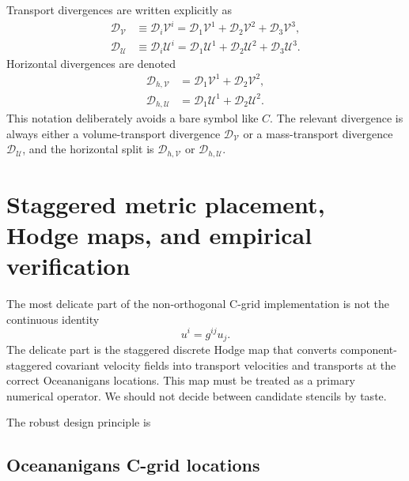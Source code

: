 \documentclass[11pt]{article}
\newcommand{\mc}[1]{\mathcal{#1}}
\newcommand{\Div}{\mc{D}}
\newcommand{\Vflux}{\mc{V}}
\newcommand{\Uflux}{\mc{U}}
\newcommand{\Dvol}{\Div_{\Vflux}}
\newcommand{\Dmass}{\Div_{\Uflux}}
\newcommand{\Dhvol}{\Div_{h,\Vflux}}
\newcommand{\Dhmass}{\Div_{h,\Uflux}}
\begin{document}
Transport divergences are written explicitly as
\begin{align}
  \Dvol
  &\equiv \Div_i \Vflux^i
   = \Div_1\Vflux^1 + \Div_2\Vflux^2 + \Div_3\Vflux^3,
  \label{eq:volume-divergence} \\
  \Dmass
  &\equiv \Div_i \Uflux^i
   = \Div_1\Uflux^1 + \Div_2\Uflux^2 + \Div_3\Uflux^3.
  \label{eq:mass-divergence}
\end{align}
Horizontal divergences are denoted
\begin{align}
  \Dhvol &= \Div_1\Vflux^1 + \Div_2\Vflux^2, \\
  \Dhmass &= \Div_1\Uflux^1 + \Div_2\Uflux^2.
\end{align}
This notation deliberately avoids a bare symbol like \(C\).  The relevant divergence is always either a volume-transport divergence \(\Dvol\) or a mass-transport divergence \(\Dmass\), and the horizontal split is \(\Dhvol\) or \(\Dhmass\).



\section{Staggered metric placement, Hodge maps, and empirical verification}
\label{sec:staggered-hodge}

The most delicate part of the non-orthogonal C-grid implementation is not the continuous identity
\begin{equation}
  u^i = g^{ij}u_j.
\end{equation}
The delicate part is the staggered discrete Hodge map that converts component-staggered covariant velocity fields into transport velocities and transports at the correct Oceananigans locations.  This map must be treated as a primary numerical operator.  We should not decide between candidate stencils by taste.

The robust design principle is
\begin{center}
\end{center}

\subsection{Oceananigans C-grid locations}
\label{subsec:cgrid-locations}
\end{document}
